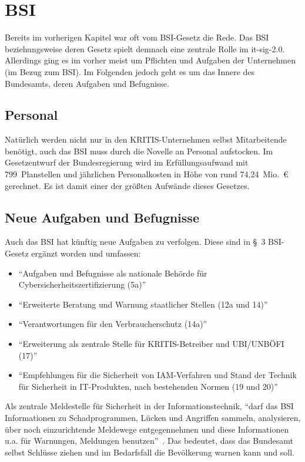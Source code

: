 \chapter{BSI}\label{ch:bsi}
Bereits im vorherigen Kapitel war oft vom BSI-Gesetz die Rede.
Das BSI beziehungsweise deren Gesetz spielt demnach eine zentrale Rolle im \acrshort{it-sig-2.0}.
Allerdings ging es im vorher meist um Pflichten und Aufgaben der Unternehmen (im Bezug zum BSI).
Im Folgenden jedoch geht es um das Innere des Bundesamts, deren Aufgaben und Befugnisse.

\section{Personal}\label{sec:personal}
Natürlich werden nicht nur in den KRITIS-Unternehmen selbst Mitarbeitende benötigt,
auch das BSI muss durch die Novelle an Personal aufstocken.
Im Gesetzentwurf der Bundesregierung wird im Erfüllungsaufwand mit 799~Planstellen und
jährlichen Personalkosten in Höhe von rund 74,24~Mio.~€ gerechnet.
Es ist damit einer der größten Aufwände dieses Gesetzes.

\section{Neue Aufgaben und Befugnisse}\label{sec:neue-aufgaben-und-befugnisse}
Auch das BSI hat künftig neue Aufgaben zu verfolgen.
Diese sind in §~3 BSI-Gesetz ergänzt worden und umfassen:
\begin{itemize}
    \item \enquote{Aufgaben und Befugnisse als nationale Behörde für Cybersicherheitszertifizierung (5a)}~\cite{neue-it-sig-2.0}
    \item \enquote{Erweiterte Beratung und Warnung staatlicher Stellen (12a und 14)}~\cite{neue-it-sig-2.0}
    \item \enquote{Verantwortungen für den Verbraucherschutz (14a)}~\cite{neue-it-sig-2.0}
    \item \enquote{Erweiterung als zentrale Stelle für KRITIS-Betreiber und UBI/UNBÖFI (17)}~\cite{neue-it-sig-2.0}
    \item \enquote{Empfehlungen für die Sicherheit von IAM-Verfahren und Stand der Technik für Sicherheit in IT-Produkten, nach bestehenden Normen (19 und 20)}~\cite{neue-it-sig-2.0}
\end{itemize}

Als zentrale Meldestelle für Sicherheit in der Informationstechnik,
\enquote{darf das BSI Informationen zu Schadprogrammen, Lücken und Angriffen sammeln, analysieren,
über noch einzurichtende Meldewege entgegennehmen und diese Informationen u.a. für Warnungen, Meldungen benutzen}~\cite{neue-it-sig-2.0}.
Das bedeutet, dass das Bundesamt selbst Schlüsse ziehen und im Bedarfsfall die Bevölkerung warnen kann und soll.

